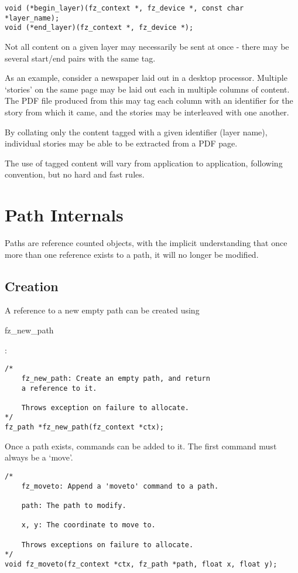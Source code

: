 \documentclass[oneside]{book}
\begin{document}
\begin{lstlisting}
void (*begin_layer)(fz_context *, fz_device *, const char *layer_name);
void (*end_layer)(fz_context *, fz_device *);
\end{lstlisting}

Not all content on a given layer may necessarily be sent at once - there may be several start/end pairs with the same tag.

As an example, consider a newspaper laid out in a desktop processor. Multiple `stories' on the same page may be laid out each in multiple  columns of content. The PDF file produced from this may tag each column with an identifier for the story from which it came, and the stories may be interleaved with one another.

By collating only the content tagged with a given identifier (layer name), individual stories may be able to be extracted from a PDF page.

The use of tagged content will vary from application to application, following convention, but no hard and fast rules.

\chapter{Path Internals}
\label{Paths}

Paths are reference counted objects, with the implicit understanding that once more than one reference exists to a path, it will no longer be modified.

\section{Creation}
\label{PathCreation}

A reference to a new empty path can be created using \begin{tt}fz\_new\_path\end{tt}:

\begin{lstlisting}
/*
	fz_new_path: Create an empty path, and return
	a reference to it.

	Throws exception on failure to allocate.
*/
fz_path *fz_new_path(fz_context *ctx);
\end{lstlisting}

Once a path exists, commands can be added to it. The first command must always be a `move'.

\begin{lstlisting}
/*
	fz_moveto: Append a 'moveto' command to a path.

	path: The path to modify.

	x, y: The coordinate to move to.

	Throws exceptions on failure to allocate.
*/
void fz_moveto(fz_context *ctx, fz_path *path, float x, float y);
\end{lstlisting}
\end{document}
